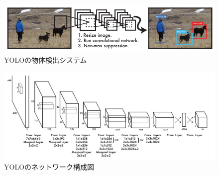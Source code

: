 \begin{figure}[htbp]
  \begin{center}
    \includegraphics[width=\textwidth]{figs/Yolo_Detection_system.png}
    \caption{YOLOの物体検出システム\cite{yolov3}}
    \label{fig:yolo_system}
  \end{center}
\end{figure}

\begin{figure}[htbp]
  \begin{center}
    \includegraphics[width=\textwidth]{figs/yolo_architecture.png}
    \caption{YOLOのネットワーク構成図\cite{yolov3}}
    \label{fig:yolo_network}
  \end{center}
 \end{figure}